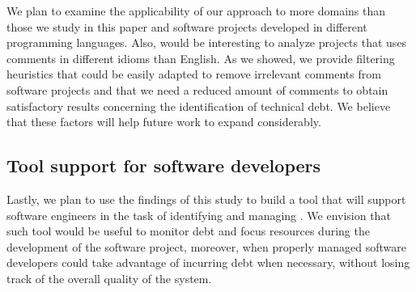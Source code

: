 We plan to examine the applicability of our approach to more domains than those we study in this paper and software projects developed in different programming languages. Also, would be interesting to analyze projects that uses comments in different idioms than English. As we showed, we provide filtering heuristics that could be easily adapted to remove irrelevant comments from software projects and that we need a reduced amount of comments to obtain satisfactory results concerning the identification of technical debt. We believe that these factors will help future work to expand considerably. 

\subsection{Tool support for software developers}

Lastly, we plan to use the findings of this study to build a tool that will support software engineers in the task of identifying and managing \SATD. We envision that such tool would be useful to monitor debt and focus resources during the development of the software project, moreover, when properly managed software developers could take advantage of incurring debt when necessary, without losing track of the overall quality of the system.
